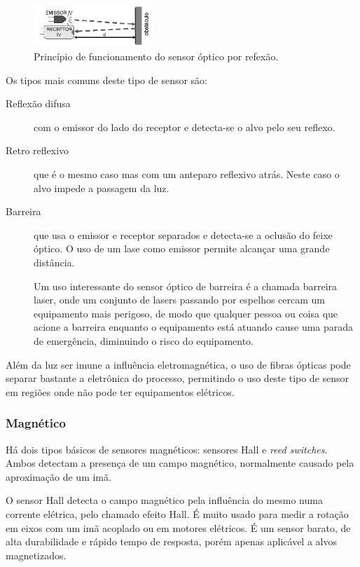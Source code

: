 \begin{figure}
  \centering
  \includegraphics[width=0.4\textwidth]{figuras/sensorOptico}
  \caption{Princípio de funcionamento do sensor óptico por refexão.}\label{fig:sensorOptico}
\end{figure}

Os tipos mais comuns deste tipo de sensor são:
\begin{description}
  \item[Reflexão difusa] com o emissor do lado do receptor e detecta-se o alvo pelo seu reflexo.
  \item[Retro reflexivo] que é o mesmo caso mas com um anteparo reflexivo atrás. Neste caso o alvo impede a passagem da luz.
  \item[Barreira] que usa o emissor e receptor separados e detecta-se a oclusão do feixe óptico. O uso de um lase como emissor permite alcançar uma grande distância.

  Um uso interessante do sensor óptico de barreira é a chamada barreira laser, onde um conjunto de lasers passando por espelhos cercam um equipamento mais perigoso, de modo que qualquer pessoa ou coisa que acione a barreira enquanto o equipamento está atuando cause uma parada de emergência, diminuindo o risco do equipamento.
\end{description}

Além da luz ser imune a influência eletromagnética, o uso de fibras ópticas pode separar bastante a eletrônica do processo, permitindo o uso deste tipo de sensor em regiões onde não pode ter equipamentos elétricos.

\subsubsection{Magnético}
\label{subs:Magnetico}

Há dois tipos básicos de sensores magnéticos: sensores Hall e \emph{reed switches}. Ambos detectam a presença de um campo magnético, normalmente causado pela aproximação de um imã.

O sensor Hall detecta o campo magnético pela influência do mesmo numa corrente elétrica, pelo chamado efeito Hall. É muito usado para medir a rotação em eixos com um imã acoplado ou em motores elétricos. É um sensor barato, de alta durabilidade e rápido tempo de resposta, porém apenas aplicável a alvos magnetizados.


